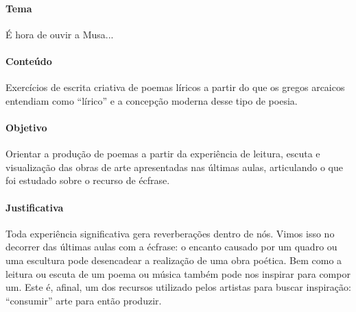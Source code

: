 \documentclass[12pt]{extarticle}
\begin{document}



\paragraph{Tema} É hora de ouvir a Musa...  

\paragraph{Conteúdo} Exercícios de escrita criativa de poemas líricos a partir
do que os gregos arcaicos entendiam como ``lírico'' e a concepção moderna
desse tipo de poesia. 

\paragraph{Objetivo} Orientar a produção de poemas a partir da experiência
de leitura, escuta e visualização das obras de arte apresentadas nas últimas
aulas, articulando o que foi estudado sobre o recurso de écfrase.

\paragraph{Justificativa} Toda experiência significativa gera reverberações
dentro de nós. Vimos isso no decorrer das últimas aulas com a écfrase: o 
encanto causado por um quadro ou uma escultura pode desencadear a realização
de uma obra poética. Bem como a leitura ou escuta de um poema ou música 
também pode nos inspirar para compor um. Este é, afinal, um dos recursos
utilizado pelos artistas para buscar inspiração: ``consumir'' arte para
então produzir. 
\end{document}
